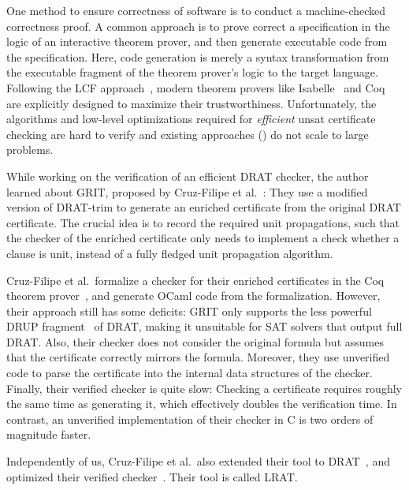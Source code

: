 \documentclass[smallcondensed]{svjour3}     %
\begin{document}
One method to ensure correctness of software is to conduct a machine-checked correctness proof. 
A common approach is to prove correct a specification in the logic of an interactive theorem prover, and then generate executable code from 
the specification. Here, code generation is merely a syntax transformation from the executable fragment of the theorem prover's logic to the target language.
Following the LCF approach~\cite{Gord00}, modern theorem provers like Isabelle~\cite{NPW02} and Coq~\cite{BeCa10} are explicitly designed to maximize their trustworthiness.
Unfortunately, the algorithms and low-level optimizations required for \emph{efficient} unsat certificate checking are 
hard to verify and existing approaches (\eg \cite{DFM10,WHH13}) do not scale to large problems.

While working on the verification of an efficient DRAT checker, the author learned about GRIT, proposed by Cruz-Filipe et al.\ \cite{CMS17}: 
They use a modified version of DRAT-trim to generate an enriched certificate from the original DRAT certificate. 
The crucial idea is to record the required unit propagations, such that the checker of the enriched certificate only needs 
to implement a check whether a clause is unit, instead of a fully fledged unit propagation algorithm.

Cruz-Filipe et al.\ formalize a checker for their enriched certificates in the Coq theorem prover~\cite{BeCa10}, and generate OCaml code from the formalization. 
However, their approach still has some deficits:
GRIT only supports the less powerful DRUP fragment~\cite{WHH13} of DRAT, making it unsuitable for SAT solvers that output full DRAT.
Also, their checker does not consider the original formula but assumes that the certificate correctly mirrors the formula. 
Moreover, they use unverified code to parse the certificate into the internal data structures of the checker.
Finally, their verified checker is quite slow: Checking a certificate requires roughly the same time as generating it, which effectively doubles the verification time.
In contrast, an unverified implementation of their checker in C is two orders of magnitude faster.

Independently of us, Cruz-Filipe et al.~also extended their tool to DRAT~\cite{CHHKS17}, and optimized their verified checker~\cite{HHKW17}. Their tool is called LRAT.
\end{document}
